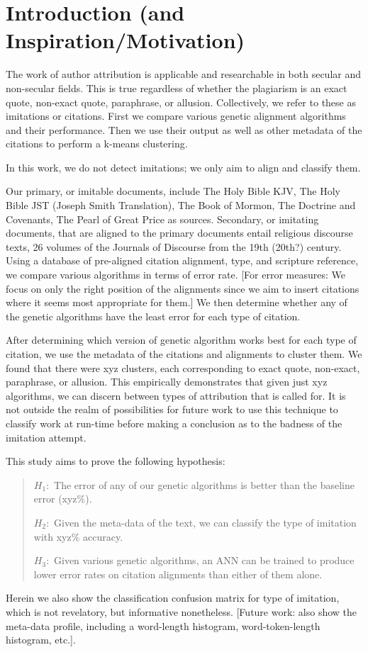 \section {Introduction (and Inspiration/Motivation)}

The work of author attribution is applicable and researchable in both secular and non-secular fields. This is true regardless of whether the plagiarism is an exact quote, non-exact quote, paraphrase, or allusion. Collectively, we refer to these as imitations or citations. First we compare various genetic alignment algorithms and their performance. Then we use their output as well as other metadata of the citations to perform a k-means clustering.

In this work, we do not detect imitations; we only aim to align and classify them.

Our primary, or imitable documents, include The Holy Bible KJV, The Holy Bible JST (Joseph Smith Translation), The Book of Mormon, The Doctrine and Covenants, The Pearl of Great Price as sources. Secondary, or imitating documents, that are aligned to the primary documents entail religious discourse texts, 26 volumes of the Journals of Discourse from the 19th (20th?) century. Using a database of pre-aligned citation alignment, type, and scripture reference, we compare various algorithms in terms of error rate. %
[For error measures: We focus on only the right position of the alignments since we aim to insert citations where it seems most appropriate for them.] We then determine whether any of the genetic algorithms have the least error for each type of citation.

After determining which version of genetic algorithm works best for each type of citation, we use the metadata of the citations and alignments to cluster them. We found that there were xyz clusters, each corresponding to exact quote, non-exact, paraphrase, or allusion. This empirically demonstrates that given just xyz algorithms, we can discern between types of attribution that is called for. It is not outside the realm of possibilities for future work to use this technique to classify work at run-time before making a conclusion as to the badness of the imitation attempt.

This study aims to prove the following hypothesis:
	\begin{quote}
		$H_{1}:$ The error of any of our genetic algorithms is better than the baseline error (xyz\%).

		$H_{2}:$ Given the meta-data of the text, we can classify the type of imitation with xyz\% accuracy.

		$H_{3}:$ Given various genetic algorithms, an ANN can be trained to produce lower error rates on citation alignments than either of them alone.
	\end{quote}

Herein we also show the classification confusion matrix for type of imitation, which is not revelatory, but informative nonetheless.  [Future work: also show the meta-data profile, including a word-length histogram, word-token-length histogram, etc.].  
